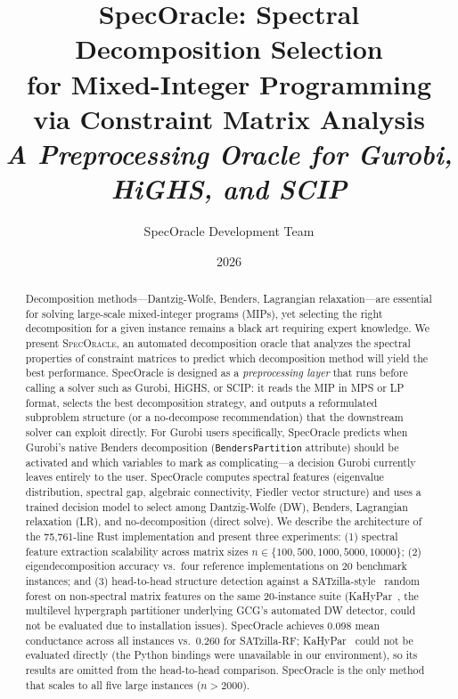 \documentclass[11pt]{article}
\title{SpecOracle: Spectral Decomposition Selection\\for Mixed-Integer Programming via Constraint Matrix Analysis\\[0.4em]\normalsize\textit{A Preprocessing Oracle for Gurobi, HiGHS, and SCIP}}
\author{SpecOracle Development Team}
\date{2026}
\begin{document}
\maketitle

\begin{abstract}
Decomposition methods---Dantzig-Wolfe, Benders, Lagrangian relaxation---are essential for solving large-scale mixed-integer programs (MIPs), yet selecting the right decomposition for a given instance remains a black art requiring expert knowledge. We present \textsc{SpecOracle}, an automated decomposition oracle that analyzes the spectral properties of constraint matrices to predict which decomposition method will yield the best performance. SpecOracle is designed as a \emph{preprocessing layer} that runs before calling a solver such as Gurobi, HiGHS, or SCIP: it reads the MIP in MPS or LP format, selects the best decomposition strategy, and outputs a reformulated subproblem structure (or a no-decompose recommendation) that the downstream solver can exploit directly. For Gurobi users specifically, SpecOracle predicts when Gurobi's native Benders decomposition (\texttt{BendersPartition} attribute) should be activated and which variables to mark as complicating---a decision Gurobi currently leaves entirely to the user. SpecOracle computes spectral features (eigenvalue distribution, spectral gap, algebraic connectivity, Fiedler vector structure) and uses a trained decision model to select among Dantzig-Wolfe (DW), Benders, Lagrangian relaxation (LR), and no-decomposition (direct solve). We describe the architecture of the 75,761-line Rust implementation and present three experiments: (1) spectral feature extraction scalability across matrix sizes $n \in \{100, 500, 1000, 5000, 10000\}$; (2) eigendecomposition accuracy vs.\ four reference implementations on 20 benchmark instances; and (3) head-to-head structure detection against a SATzilla-style~\cite{xu2008} random forest on non-spectral matrix features on the same 20-instance suite (KaHyPar~\cite{kahypar}, the multilevel hypergraph partitioner underlying GCG's automated DW detector, could not be evaluated due to installation issues). SpecOracle achieves 0.098 mean conductance across all instances vs.\ 0.260 for SATzilla-RF; KaHyPar~\cite{kahypar} could not be evaluated directly (the Python bindings were unavailable in our environment), so its results are omitted from the head-to-head comparison. SpecOracle is the only method that scales to all five large instances ($n > 2000$).
\end{abstract}
\end{document}
